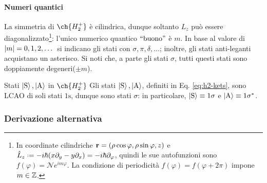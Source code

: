 \paragraph{Numeri quantici}

La simmetria di $ \ch{H_2^+} $ è cilindrica, dunque soltanto $ L_z $ può essere diagonalizzato\footnote{In coordinate cilindriche $ \mathbf{r} = (\rho \cos \varphi, \rho \sin \varphi, z) $ e $ \hat{L}_z \defeq -i\hbar (x \pa_y - y \pa_x) = -i \hbar \pa_\varphi $, quindi le sue autofunzioni sono $ f(\varphi) = \mathcal{N} e^{i m \varphi} $. La condizione di periodicità $ f(\varphi) = f(\varphi + 2\pi) $ impone $ m \in \mathbb{Z} $.}: l'unico numerico quantico $ ``\text{buono}" $ è $ m $. In base al valore di $ \left\lvert m\right\rvert = 0, 1, 2, \dots $ si indicano gli stati con $ \sigma, \pi, \delta, \dots $; inoltre, gli stati anti-leganti acquistano un asterisco. Si noti che, a parte gli stati $ \sigma $, tutti questi stati sono doppiamente degeneri\footnotemark ($ \pm m $).

\begin{example}{Stati $ \ket{\text{S}},\ket{\text{A}} $ in $ \ch{H_2^+} $}{}
	Gli stati $ \ket{\text{S}},\ket{\text{A}} $, definiti in Eq. \ref{eq:h2-kets}, sono LCAO di soli stati $ \text{1s} $, dunque sono stati $ \sigma $: in particolare, $ \ket{\text{S}} \equiv 1\sigma $ e $ \ket{\text{A}} \equiv 1\sigma^* $.
\end{example}


\subsubsection{Derivazione alternativa}

